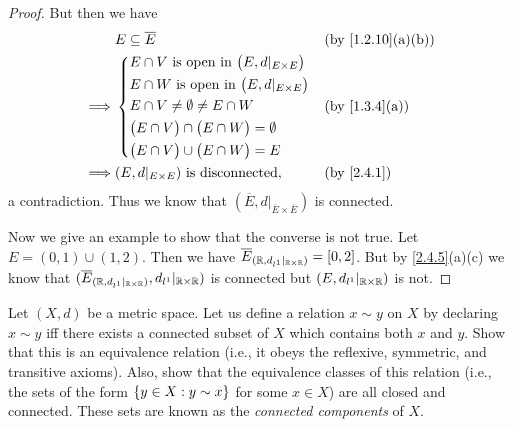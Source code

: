 \begin{proof}
  But then we have
  \begin{align*}
             & E \subseteq \overline{E}                                     &  & \text{(by \cref{1.2.10}(a)(b))} \\
    \implies & \begin{dcases}
                 E \cap V \text{ is open in } \big(E, d|_{E \times E}\big) \\
                 E \cap W \text{ is open in } \big(E, d|_{E \times E}\big) \\
                 E \cap V \neq \emptyset \neq E \cap W                     \\
                 \big(E \cap V\big) \cap \big(E \cap W\big) = \emptyset    \\
                 \big(E \cap V\big) \cup \big(E \cap W\big) = E
               \end{dcases} &  & \text{(by \cref{1.3.4}(a))}                                         \\
    \implies & (E, d|_{E \times E}) \text{ is disconnected},                &  & \by{2.4.1}
  \end{align*}
  a contradiction.
  Thus we know that \((\overline{E}, d|_{\overline{E} \times \overline{E}})\) is connected.

  Now we give an example to show that the converse is not true.
  Let \(E = (0, 1) \cup (1, 2)\).
  Then we have \(\overline{E}_{(\mathbb{R}, d_{l^1}|_{\mathbb{R} \times \mathbb{R}})} = [0, 2]\).
  But by \cref{2.4.5}(a)(c) we know that \((\overline{E}_{(\mathbb{R}, d_{l^1}|_{\mathbb{R} \times \mathbb{R}})}, d_{l^1}|_{\mathbb{R} \times \mathbb{R}})\) is connected but \((E, d_{l^1}|_{\mathbb{R} \times \mathbb{R}})\) is not.
\end{proof}

\begin{ex}\label{ex:2.4.9}
  Let \((X, d)\) be a metric space. Let us define a relation \(x \sim y\) on \(X\) by declaring \(x \sim y\) iff there exists a connected subset of \(X\) which contains both \(x\) and \(y\).
  Show that this is an equivalence relation (i.e., it obeys the reflexive, symmetric, and transitive axioms).
  Also, show that the equivalence classes of this relation (i.e., the sets of the form \(\left\lbrace y \in  X : y \sim x\right\rbrace\) for some \(x \in X\)) are all closed and connected.
  These sets are known as the \emph{connected components} of \(X\).
\end{ex}

